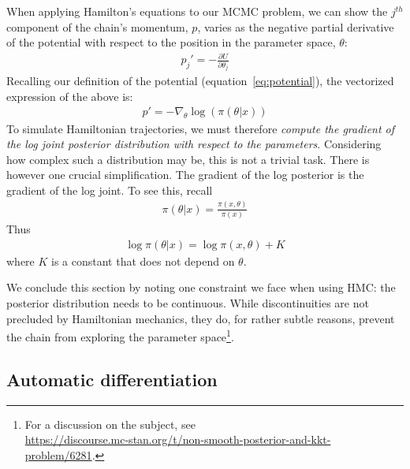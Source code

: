 \documentclass[11pt]{article}
\begin{document}
  When applying Hamilton's equations to our MCMC problem, we can show the $j^{th}$ 
  component of the chain's momentum, $p$, varies as the negative partial derivative of 
  the potential with respect to the position in the parameter space, $\theta$:
  \begin{eqnarray*}
    p_j' = - \frac{\partial{U}}{\partial{\theta_j}}
  \end{eqnarray*}
  Recalling our definition of the potential (equation~\ref{eq:potential}), the vectorized 
  expression of the above is:
  \begin{eqnarray}
    p' = - \nabla_\theta \log(\pi(\theta | x))
  \label{eq:gradient}
  \end{eqnarray}
  To simulate Hamiltonian trajectories, we must therefore \textit{compute the gradient 
  of the log joint posterior distribution with respect to the parameters}.
  Considering how complex such a distribution may be, this is not a trivial task.
  There is however one crucial simplification.
  The gradient of the log posterior is the gradient of the log joint.
  To see this, recall
  \begin{eqnarray*}
    \pi(\theta | x) = \frac{\pi (x, \theta)}{\pi(x)}
  \end{eqnarray*}
  Thus
  \begin{eqnarray*}
    \log \pi(\theta | x) = \log \pi(x, \theta) + K
  \end{eqnarray*}
  where $K$ is a constant that does not depend on $\theta$.
  
  We conclude this section by noting one constraint we face when using HMC: the posterior distribution 
  needs to be continuous. While discontinuities are not precluded by Hamiltonian mechanics,
  they do, for rather subtle reasons, prevent the
  chain from exploring the parameter space\footnote{For a discussion on the subject,
  see \\ \url{https://discourse.mc-stan.org/t/non-smooth-posterior-and-kkt-problem/6281}.}. 
  
  \subsection{Automatic differentiation}
\end{document}
